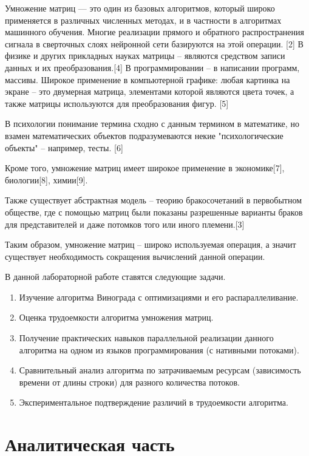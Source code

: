 \documentclass[a4paper,14pt]{article} %
\begin{document}
	Умножение матриц — это один из базовых алгоритмов, который широко применяется в различных численных методах, и в частности в алгоритмах машинного обучения. Многие реализации прямого и обратного распространения сигнала в сверточных слоях нейронной сети базируются на этой операции. [2] В физике и других прикладных науках матрицы – являются средством записи данных и их преобразования.[4] В программировании – в написании программ, массивы. Широкое применение в компьютерной графике: любая картинка на экране – это двумерная матрица, элементами которой являются цвета точек, а также матрицы используются для преобразования фигур. [5]
	
	В психологии понимание термина сходно с данным термином в математике, но взамен математических объектов подразумеваются некие "психологические объекты" – например, тесты. [6]
	
	Кроме того, умножение матриц имеет широкое применение в экономике[7], биологии[8], химии[9]. 
	
	Также существует абстрактная модель – теорию бракосочетаний в первобытном обществе, где с помощью матриц были показаны разрешенные варианты браков для представителей и даже потомков того или иного племени.[3]
	
	Таким образом, умножение матриц -- широко используемая операция, а значит существует необходимость сокращения вычислений данной операции. 
	
	\hfill
	
	В данной лабораторной работе ставятся следующие задачи. 
        \begin{enumerate} 
		\item Изучение алгоритма Винограда с оптимизациями и его распараллеливание. 
		\item Оценка трудоемкости алгоритма умножения матриц.
		\item Получение практических навыков параллельной реализации данного алгоритма на одном из языков программирования (с нативными потоками). 
		\item Сравнительный анализ алгоритма по затрачиваемым ресурсам (зависимость времени от длины строки) для разного количества потоков. 
		\item Экспериментальное подтверждение различий в трудоемкости алгоритма. 
	\end{enumerate}
	
	\newpage


        \section{Аналитическая часть}
        \hfill
        
\end{document}
